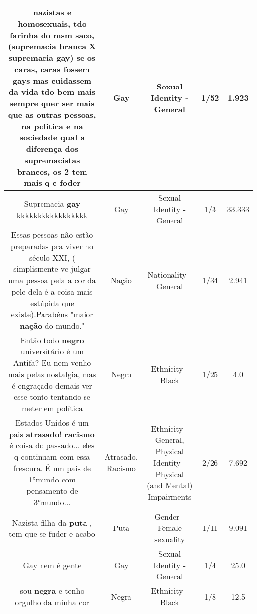 \documentclass[11pt]{article}
\newlength\mylength
\begin{document}
\begin{center}
\begin{longtable}{|C{.65\mylength}|C{.30\mylength}|C{.12\mylength}|C{.12\mylength}|C{.12\mylength}|}
  \small nazistas e homosexuais, tdo farinha do msm saco, (supremacia branca X  supremacia \textbf{gay}) se os caras, caras fossem gays mas cuidassem da vida tdo bem mais sempre quer ser mais que as outras pessoas, na politica e na sociedade qual a diferença dos supremacistas brancos, os 2 tem mais q c foder\normalsize   & Gay & Sexual Identity - General & 1/52 & 1.923 \\  \hline
  \small Supremacia \textbf{gay} kkkkkkkkkkkkkkkkk\normalsize   & Gay & Sexual Identity - General & 1/3 & 33.333 \\  \hline
  \small Essas pessoas não estão preparadas pra viver no século XXI, ( simplismente vc julgar uma pessoa pela a cor da pele dela é a coisa mais estúpida que existe).Parabéns "maior \textbf{nação} do mundo."\normalsize   & Nação & Nationality - General & 1/34 & 2.941 \\  \hline
  \small Então todo \textbf{negro} universitário é um Antifa? Eu nem venho mais pelas nostalgia, mas é engraçado demais ver esse tonto tentando se meter em política\normalsize   & Negro & Ethnicity - Black & 1/25 & 4.0 \\  \hline
  \small Estados Unidos é um pais \textbf{atrasado}! \textbf{racismo} é coisa do passado... eles q continuam com essa frescura. É um pais de 1°mundo com pensamento de 3°mundo...\normalsize   & Atrasado, Racismo & Ethnicity - General, Physical Identity - Physical (and Mental) Impairments & 2/26 & 7.692 \\  \hline
  \small Nazista filha da \textbf{puta} , tem que se fuder e acabo\normalsize   & Puta & Gender - Female sexuality & 1/11 & 9.091 \\  \hline
  \small Gay nem é gente\normalsize   & Gay & Sexual Identity - General & 1/4 & 25.0 \\  \hline
  \small sou \textbf{negra} e tenho orgulho da minha cor\normalsize   & Negra & Ethnicity - Black & 1/8 & 12.5 \\  \hline

\end{longtable}
\end{center}
\end{document}
